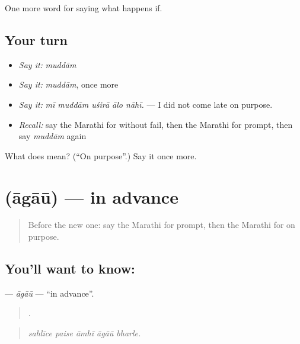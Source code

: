 \begin{grammarlens}[title={What you've built}]
One more word for saying what happens if.
\end{grammarlens}

\subsection*{Your turn}
\begin{itemize}
\raggedright
  \item \emph{Say it:} \emph{muddām}
  \item \emph{Say it:} \emph{muddām}, once more
  \item \emph{Say it:} \emph{mī muddām uśirā ālo nāhī.} — I did not come late on purpose.
  \item \emph{Recall:} say the Marathi for without fail, then the Marathi for prompt, then say \emph{muddām} again
\end{itemize}

\begin{tcolorbox}[breakable,colback=teal!4,colframe=teal!35!black,title={Before you move on}]
What does  mean? (\textquotedblleft{}On purpose\textquotedblright{}.) Say it once more.
\end{tcolorbox}
\section[\texorpdfstring{\mr{आगाऊ} (āgāū)}{आगाऊ (āgāū)}]{ (āgāū) — in advance}

\label{lesson:MR-C554-agau}



\begin{quote}
Before the new one: say the Marathi for prompt, then the Marathi for on purpose.
\end{quote}

\subsection*{You'll want to know: }
\textbf{} — \emph{āgāū} — \textquotedblleft{}in advance\textquotedblright{}.

\begin{quote}
    .
\end{quote}

\begin{quote}
\emph{sahlīce paise āmhī āgāū bharle.}
\end{quote}

